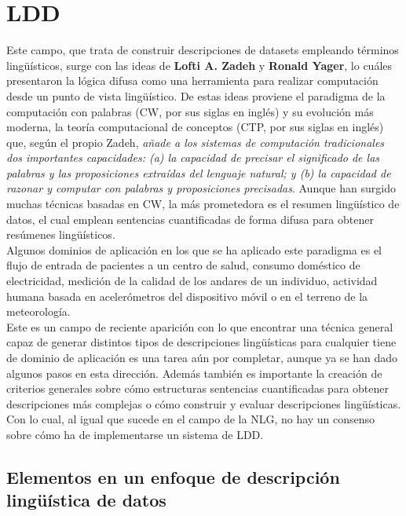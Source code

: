 \documentclass[10pt,a4paper]{article}
\begin{document}
\section{LDD}

Este campo, que trata de construir descripciones de datasets empleando términos lingüísticos, surge con las ideas de \textbf{Lofti A. Zadeh} y \textbf{Ronald Yager}, lo cuáles presentaron la lógica difusa como una herramienta para realizar computación desde un punto de vista lingüístico. De estas ideas proviene el paradigma de la computación con palabras (CW, por sus siglas en inglés) y su evolución más moderna, la teoría computacional de conceptos (CTP, por sus siglas en inglés) que, según el propio Zadeh, \textit{añade a los sistemas de computación tradicionales dos importantes capacidades: (a) la capacidad de precisar el significado de las palabras y las proposiciones extraídas del lenguaje natural; y (b) la capacidad de razonar y computar con palabras y proposiciones precisadas}. Aunque han surgido muchas técnicas basadas en CW, la más prometedora es el resumen lingüístico de datos, el cual emplean sentencias cuantificadas de forma difusa para obtener resúmenes lingüísticos.\\

Algunos dominios de aplicación en los que se ha aplicado este paradigma es el flujo de entrada de pacientes a un centro de salud, consumo doméstico de electricidad, medición de la calidad de los andares de un individuo, actividad humana basada en acelerómetros del dispositivo móvil o en el terreno de la meteorología.\\

Este es un campo de reciente aparición con lo que encontrar una técnica general capaz de generar distintos tipos de descripciones lingüísticas para cualquier tiene de dominio de aplicación es una tarea aún por completar, aunque ya se han dado algunos pasos en esta dirección. Además también es importante la creación de criterios generales sobre cómo estructuras sentencias cuantificadas para obtener descripciones más complejas o cómo construir y evaluar descripciones lingüísticas. Con lo cual, al igual que sucede en el campo de la NLG, no hay un consenso sobre cómo ha de implementarse un sistema de LDD.

\subsection{Elementos en un enfoque de descripción lingüística de datos}
\end{document}
